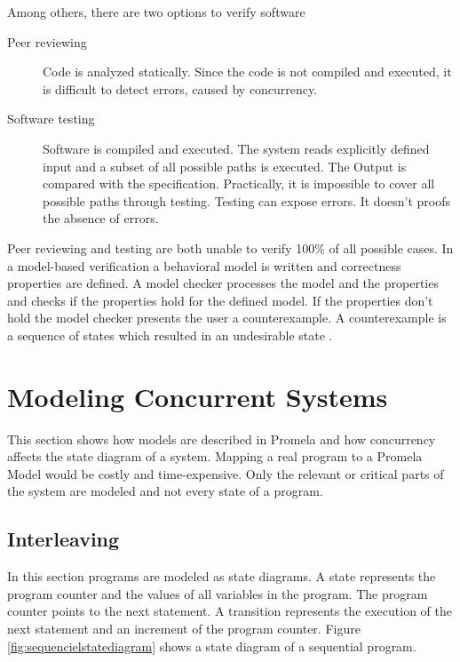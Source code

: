 \documentclass[a4paper, twoside]{article}
\begin{document}
Among others, there are two options to verify software
\begin{description}
\item[Peer reviewing] Code is analyzed statically. Since the code is not compiled and executed, it is difficult to detect errors, caused by concurrency.
\item[Software testing] Software is compiled and executed. The system reads explicitly defined input and a subset of all possible paths is executed. The Output is compared with the specification. Practically, it is impossible to cover all possible paths through testing. Testing can expose errors. It doesn't proofs the absence of errors.
\end{description}

Peer reviewing and testing are both unable to verify 100\% of all possible cases. In a model-based verification a behavioral model is written and correctness properties are defined. A model checker processes the model and the properties and checks if the properties hold for the defined model. If the properties don't hold the model checker presents the user a counterexample. A counterexample is a sequence of states which resulted in an undesirable state \cite{baier08}.

\section{Modeling Concurrent Systems}
\label{sec:concurrency}

This section shows how models are described in Promela and how concurrency affects the state diagram of a system. Mapping a real program to a Promela Model would be costly and time-expensive. Only the relevant or critical parts of the system are modeled and not every state of a program.


\subsection{Interleaving}
\label{sec:interleaving}

In this section programs are modeled as state diagrams. A state represents the program counter and the values of all variables in the program. The program counter points to the next statement. A transition represents the execution of the next statement and an increment of the program counter. Figure \ref{fig:sequencielstatediagram} shows a state diagram of a sequential program. 
\end{document}
